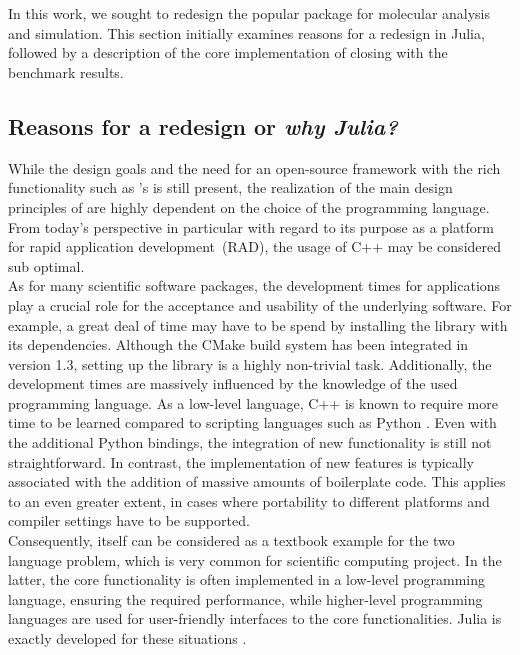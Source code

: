
\section{\biochem}
\label{sec:juliaball}
In this work, we sought to redesign the popular \ball package for molecular analysis and simulation. This section initially examines reasons for a redesign in Julia, followed by a description of the core implementation of \biochem closing with the benchmark results. 

\subsection{Reasons for a redesign or \textit{why Julia?}}

While the design goals and the need for an open-source framework with the rich functionality such as \ball's  is still present, the realization of the main design principles of \ball are highly dependent on the choice of the programming language. From today's perspective in particular with regard to its purpose as a platform for rapid application development~(RAD), the usage of C++ may be considered sub optimal. \\
As for many scientific software packages, the development times for applications play a crucial role for the acceptance and usability of the underlying software. For example, a great deal of time may have to be spend by installing the library with its dependencies. Although the CMake build system has been integrated in version 1.3, setting up the library is a highly non-trivial task. Additionally, the development times are massively influenced by the knowledge of the used programming language. As a low-level language, C++ is known to require more time to be learned compared to scripting languages such as Python \cite{Ousterhout1998}. 
Even with the additional Python bindings, the integration of new functionality is still not straightforward. In contrast, the implementation of new features is typically associated with the addition of massive amounts of boilerplate code. This applies to an even greater extent, in cases where portability to different platforms and compiler settings have to be supported. \\
Consequently, \ball itself can be considered as a textbook example for the two language problem, which is very common for scientific computing project. In the latter, the core functionality is often implemented in a low-level programming language, ensuring the required performance, while higher-level programming languages are used for user-friendly interfaces to the core functionalities. Julia is exactly developed for these situations \cite{Julia_what, Julia_accomplish}.\\ 
